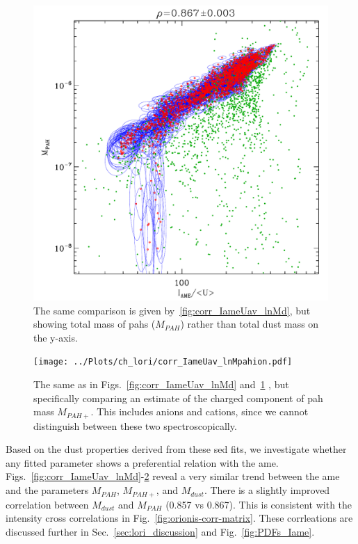               \begin{figure}
                \includegraphics[width=\textwidth]{../Plots/ch_lori/corr_IameUav_lnMpah.pdf}
                \centering
                \caption{The same comparison is given by~\ref{fig:corr_IameUav_lnMd}, but showing total mass of \acrshort{pah}s ($M_{PAH}$) rather than total dust mass on the y-axis. }
                \label{fig:corr_IameUav_lnMpah}
              \end{figure}
              \begin{figure}
                \texttt{[image: ../Plots/ch\_lori/corr\_IameUav\_lnMpahion.pdf]}
                \centering
                \caption{ The same as in Figs.~\ref{fig:corr_IameUav_lnMd} and~\ref{fig:corr_IameUav_lnMpah} , but specifically comparing an estimate of the charged component of \acrshort{pah} mass $M_{PAH+}$. This includes anions and cations, since we cannot distinguish between these two spectroscopically.}
                \label{fig:corr_IameUav_lnMpahion}
              \end{figure}
    Based on the dust properties derived from these \acrshort{sed} fits, we investigate whether any fitted parameter shows a preferential relation with the \acrshort{ame}. Figs.~\ref{fig:corr_IameUav_lnMd}-\ref{fig:corr_IameUav_lnMpahion} reveal a very similar trend between the \acrshort{ame} and the parameters $M_{PAH}$, $M_{PAH+}$, and $M_{dust}$. There is a slightly improved correlation between $M_{dust}$ and $M_{PAH}$ (0.857 vs 0.867). This is consistent with the intensity cross correlations in Fig.~\ref{fig:orionis-corr-matrix}. These corrleations are discussed further in Sec.~\ref{sec:lori_discussion} and Fig.~\ref{fig:PDFs_Iame}.

